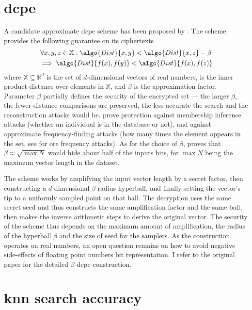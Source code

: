 	\section{\acrlong{dcpe}}

		A candidate approximate \acrshort{dcpe} scheme has been proposed by \textcite{dcpe}.
		The scheme provides the following guarantee on its ciphertexts
		\begin{multline*}
			\forall x, y, z \in \mathbb{X} : \algo{Dist}{x, y} < \algo{Dist}{x, z} - \beta \\
			\implies \algo{Dist}{f(x), f(y)} < \algo{Dist}{f(x), f(z)}
		\end{multline*}
		where $\mathbb{X} \subseteq \mathbb{R}^d$ is the set of $d$-dimensional vectors of real numbers,  is the inner product distance over elements in $\mathbb{X}$, and $\beta$ is the approximation factor.
		Parameter $\beta$ partially defines the security of the encrypted set --- the larger $\beta$, the fewer distance comparisons are preserved, the less accurate the search and the reconstruction attacks would be.
		\textcite{dcpe} prove protection against membership inference attacks \cite{memebership-inference-attacks-knn} (whether an individual is in the database or not), and against approximate frequency-finding attacks (how many times the element appears in the set, see \cite{leakage-abuse-grubs-2017} for \acrshort{ore} frequency attacks).
		As for the choice of $\beta$, \cite{dcpe} proves that $\beta \approx \sqrt{\max N}$ would hide about half of the inputs bits, for $\max N$ being the maximum vector length in the dataset.

		The scheme works by amplifying the input vector length by a secret factor, then constructing a $d$-dimensional $\beta$-radius hyperball, and finally setting the vector's tip to a uniformly sampled point on that ball.
		The decryption uses the same secret seed and thus constructs the same amplification factor and the same ball, then makes the inverse arithmetic steps to derive the original vector.
		The security of the scheme thus depends on the maximum amount of amplification, the radius of the hyperball $\beta$ and the size of seed for the samplers.
		As the construction operates on real numbers, an open question remains on how to avoid negative side-effects of floating point numbers bit representation.
		I refer to the original paper \cite{dcpe} for the detailed $\beta$-\acrshort{dcpe} construction.

	\section{\acrshort{knn} search accuracy}

